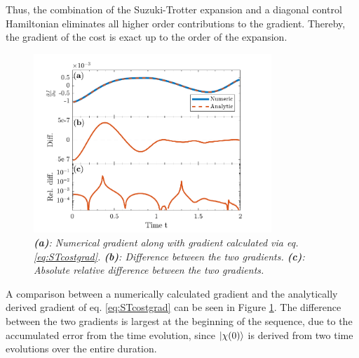 Thus, the combination of the Suzuki-Trotter expansion and a diagonal control Hamiltonian eliminates all higher order contributions to the gradient. Thereby, the gradient of the cost is exact up to the order of the expansion.
\begin{figure}[h!]
    \centering
    \includegraphics[width=0.8\textwidth]{Figures/CompareGradientsGRAPE.pdf}
    \caption{\textit{\textbf{(a)}: Numerical gradient along with gradient calculated via eq. \eqref{eq:STcostgrad}. \textbf{(b)}: Difference between the two gradients. \textbf{(c)}: Absolute relative difference between the two gradients.}}
    \label{fig:CompareGradientsGRAPE}
\end{figure}
A comparison between a numerically calculated gradient and the analytically derived gradient of eq. \eqref{eq:STcostgrad} can be seen in Figure \ref{fig:CompareGradientsGRAPE}. The difference between the two gradients is largest at the beginning of the sequence, due to the accumulated error from the time evolution, since $\ket{\chi (0)}$ is derived from two time evolutions over the entire duration.


